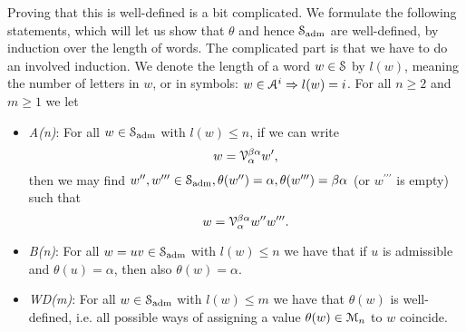 \begin{defn}
Proving that this is well-defined is a bit complicated. We formulate the following statements, which will let us show that $\theta$ and hence $\mathcal{S}_{\mathrm{adm}}$ are well-defined, by induction over the length of words.  The complicated part is that we have to do an involved induction. We denote the length of a word $w \in \mathcal{S}$ by $l(w)$, meaning the number of letters in $w$, or in symbols: $w \in \mathcal{A}^i \Rightarrow l(w) = i$.
For all $n \geq 2$ and $m \geq 1$ we let
\begin{itemize}
\item[] \emph{A(n)}: For all $w \in \mathcal{S}_{\mathrm{adm}}$ with $l(w) \leq n$, if we can write
  \begin{equation*}
  w = \mathcal{V}^{\beta\alpha}_\alpha w^\prime,
  \end{equation*}
  then we may find  $w^{\prime\prime}, w^{\prime\prime\prime} \in \mathcal{S}_{\mathrm{adm}}, \theta(w^{\prime\prime}) = \alpha, \theta(w^{\prime\prime\prime}) = \beta\alpha$ (or $w^{\prime\prime\prime}$ is empty) such that
  \begin{equation*}
  w = \mathcal{V}_\alpha^{\beta\alpha} w^{\prime\prime} w^{\prime\prime\prime}.
  \end{equation*}
\item[] \emph{B(n)}: For all $w = uv \in \mathcal{S}_{\mathrm{adm}}$ with $l(w) \leq n$ we have that if $u$ is admissible and $\theta(u) = \alpha$, then also $\theta(w) = \alpha$.
\item[] \emph{WD(m)}: For all $w \in \mathcal{S}_{\mathrm{adm}}$ with $l(w) \leq m$ we have that $\theta(w)$ is well-defined, i.e. all possible ways of assigning a value $\theta(w) \in \mathcal{M}_n$ to $w$ coincide.
\end{itemize}
\end{defn}
%
%
